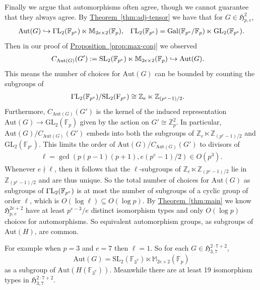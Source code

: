 \documentclass[11pt]{article}
\numberwithin{equation}{section}
\theoremstyle{definition}
\theoremstyle{plain}
\newcommand{\expref}[2]{\hyperref[#2]{#1~\ref{#2}}}
\numberwithin{equation}{section}
\theoremstyle{plain}       %
\theoremstyle{remark}
\theoremstyle{definition}
\numberwithin{figure}{section}
\numberwithin{table}{section}
\newcommand{\mygroups}{\mathfrak{H}}
\renewcommand{\subset}{\subseteq}
\newcommand{\bbF}{\mathbb{F}}  %
\begin{document}
Finally we argue that automorphisms often agree, though we cannot guarantee that
they always agree.  By \expref{Theorem}{thm:adj-tensor} we have that for $G\in
\mygroups_{p,e}^{2}$,
\begin{align*}
	\mathrm{Aut}(G) &\hookrightarrow 
	\Gamma{\rm L}_2(\bbF_{p^e})\ltimes \mathbb{M}_{2e\times 2}(\bbF_p), 
	& \Gamma{\rm L}_2(\bbF_{p^e})=\mathrm{Gal}(\bbF_{p^e}/\bbF_p)\ltimes 
		\mathrm{GL}_2(\bbF_{p^e}).
\end{align*}
Then in our proof of \expref{Proposition}{prop:max-conj} we observed
\begin{align*}
	C_{\mathrm{Aut}(G)}(G'):={\rm SL}_2(\bbF_{p^e})\ltimes 
	\mathbb{M}_{2e\times 2}(\bbF_p) &\hookrightarrow
		\mathrm{Aut}(G).
\end{align*}
This means the number of choices for $\mathrm{Aut}(G)$ can be bounded by
counting the subgroups of
\begin{align*}
	\Gamma{\rm L}_2(\bbF_{p^e})/\mathrm{SL}_2(\mathrm{F}_{p^e}) & \cong \mathbb{Z}_e \ltimes \mathbb{Z}_{(p^e-1)/2}.
\end{align*}
Furthermore, $C_{\mathrm{Aut}(G)}(G')$ is the kernel of the induced
representation $\mathrm{Aut}(G)\to \mathrm{GL}_2(\bbF_p)$ given by the action on
$G'\cong \mathbb{Z}_p^2$.  In particular,
$\mathrm{Aut}(G)/C_{\mathrm{Aut}(G)}(G')$ embeds into both the subgroups of
$\mathbb{Z}_e \ltimes \mathbb{Z}_{(p^e-1)/2}$ and $\mathrm{GL}_2(\bbF_{p^e})$.
This limits the order of $\mathrm{Aut}(G)/C_{\mathrm{Aut}(G)}(G')$ to divisors
of 
\begin{align*}
	\ell=\gcd\left(p(p-1)(p+1), e(p^e-1)/2\right)\in O(p^3).
\end{align*}
Whenever $e\nmid \ell$, then it follows that the $\ell$-subgroups of
$\mathbb{Z}_e \ltimes \mathbb{Z}_{(p^e-1)/2}$ lie in $\mathbb{Z}_{(p^e-1)/2}$
and are thus unique.  So the total number of choices for $\mathrm{Aut}(G)$ as
subgroups of $\Gamma{\rm L}_2(\bbF_{p^e})$ is at most the number of subgroups of
a cyclic group of order $\ell$, which is $O(\log \ell)\subset O(\log p)$.  By
\expref{Theorem}{thm:main} we know $\mygroups_{p,e}^{2e+2}$ have at least
$p^{e-3}/e$ distinct isomorphism types and only $O(\log p)$ choices for
automorphisms.  So equivalent automorphism groups, as subgroups of
$\mathrm{Aut}(H)$, are common.  

For example when $p=3$ and $e=7$ then $\ell=1$.   So for each $G\in
\mygroups_{3,7}^{2\cdot 7+2}$, 
\[
\mathrm{Aut}(G)=\mathrm{SL}_2(\bbF_{3^7})\ltimes
\mathbb{M}_{2e\times 2}(\bbF_p)
\]
as a subgroup of $\mathrm{Aut}(H(\bbF_{3^7}))$.
Meanwhile there are at least 19 isomorphism types in
$\mygroups_{3,7}^{2\cdot 7+2}$.
\end{document}
